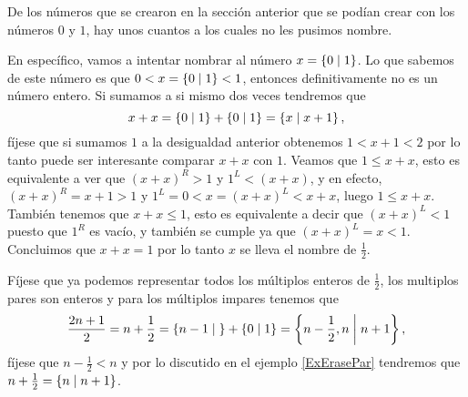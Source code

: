     \begin{example}
        De los n\'umeros que se crearon en la secci\'on anterior que se pod\'ian crear con los n\'umeros $0$ y $1$, hay unos cuantos a los cuales no les pusimos nombre.

        En espec\'ifico, vamos a intentar nombrar al n\'umero $x = \left\{0\;\middle|\; 1\right\}$. Lo que sabemos de este n\'umero es que $0 < x = \left\{0\;\middle|\; 1\right\} < 1$, entonces definitivamente no es un n\'umero entero. Si sumamos a si mismo dos veces tendremos que
        \[
            x + x = \left\{0\;\middle|\; 1\right\} + \left\{0\;\middle|\; 1\right\} = \left\{x\;\middle|\; x+1\right\},
        \]
        f\'ijese que si sumamos $1$ a la desigualdad anterior obtenemos $1 < x+1 < 2$ por lo tanto puede ser interesante comparar $x+x$ con $1$. Veamos que $1 \le x+x$, esto es equivalente a ver que $(x+x)^R > 1$ y $1^L < (x+x)$, y en efecto, $(x+x)^R = x+1 > 1$ y $1^L = 0 < x = (x+x)^L < x+x$, luego $1 \le x+x$. Tambi\'en tenemos que $x+x \le 1$, esto es equivalente a decir que $(x+x)^L < 1$ puesto que $1^R$ es vac\'io, y tambi\'en se cumple ya que $(x+x)^L = x < 1$. Concluimos que $x+x = 1$ por lo tanto $x$ se lleva el nombre de $\frac{1}{2}$.

        F\'ijese que ya podemos representar todos los m\'ultiplos enteros de $\frac{1}{2}$, los multiplos pares son enteros y para los m\'ultiplos impares tenemos que 
        \[
            \frac{2n+1}{2} = n+\frac{1}{2} = \left\{n-1\;\middle|\; \right\} + \left\{0\;\middle|\; 1\right\} = \left\{n-\frac{1}{2}, n\;\middle|\; n+1\right\},
        \]
        f\'ijese que $n-\frac{1}{2} < n$ y por lo discutido en el ejemplo \ref{ExErasePar} tendremos que $n+\frac{1}{2} = \left\{n\;\middle|\; n+1\right\}$.
    \end{example}

